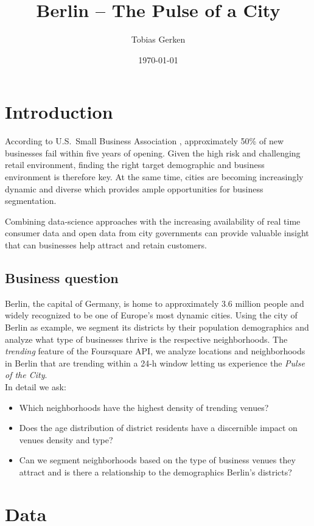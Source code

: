 \documentclass[letter]{scrartcl}
\title{Berlin -- The Pulse of a City}
\author{Tobias Gerken}
\date{\today}
\begin{document}
\maketitle

\section{Introduction}

According to  U.S.~Small Business Association \cite{SBA}, approximately 50\% of new businesses fail within five years of opening. Given the high risk and challenging retail environment, finding the right target demographic and business environment is therefore key. At the same time, cities are becoming increasingly dynamic and diverse which provides ample opportunities for business segmentation. 

Combining data-science approaches with the increasing availability of real time consumer data and open data from city governments can provide valuable insight that can businesses help attract and retain customers.  

\subsection{Business question}
Berlin, the capital of Germany, is home to approximately 3.6 million people and widely recognized to be one of Europe's most dynamic cities. 
Using the city of Berlin as example, we segment its districts by their population demographics and analyze what type of businesses thrive is the respective neighborhoods. The \emph{trending} feature of the Foursquare API, we analyze locations and neighborhoods in Berlin that are trending within a 24-h window letting us experience the \emph{Pulse of the City}.
\\

In detail we ask:
\begin{itemize}
\item Which neighborhoods have the highest density of trending venues?
\item Does the age distribution of district residents have a discernible impact on venues density and type?
\item Can we segment neighborhoods based on the type of business venues they attract and is there a relationship to the demographics Berlin's districts?  
\end{itemize}

\section{Data}
\end{document}
